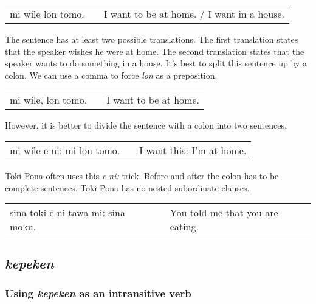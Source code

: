 \begin{supertabular}{p{5,5cm}|ll}
mi wile lon tomo. && I want to be at home. / I want in a house. \\
\end{supertabular} 

The sentence has at least two possible translations. 
The first translation states that the speaker wishes he were at home. 
The second translation states that the speaker wants to do something in a house. 
It's best to split this sentence up by a colon.
We can use a comma to force \textit{lon} as a preposition.

\begin{supertabular}{p{5,5cm}|ll}
mi wile, lon tomo. && I want to be at home. \\
\end{supertabular}

However, it is better to divide the sentence with a colon into two sentences.

\begin{supertabular}{p{5,5cm}|ll}
mi wile e ni: mi lon tomo. && I want this: I'm at home. \\
\end{supertabular} 

Toki Pona often uses this \textit{e ni:} trick. 
Before and after the colon has to be complete sentences. 
Toki Pona has no nested subordinate clauses.

\begin{supertabular}{p{5,5cm}|ll}
sina toki e ni tawa mi: sina moku. && You told me that you are eating. \\
\end{supertabular} 

{}
\subsection*{\textit{kepeken}}
%
\subsubsection*{Using \textit{kepeken} as an intransitive verb}
 
